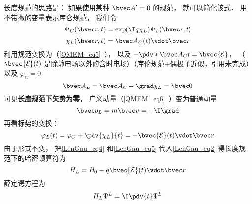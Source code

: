 长度规范的思路是： 如果使用某种 $\bvec A' = 0$ 的规范， 就可以简化该式． 用不带撇的变量表示库仑规范， 我们令
\begin{equation}\label{LenGau_eq1}
\Psi_C(\bvec r, t) = \exp(\I q\chi_L)\Psi_L(\bvec r, t)
\end{equation}
\begin{equation}
\chi_L(\bvec r, t) = \bvec A_C(t) \vdot \bvec r
\end{equation}
利用规范变换为（\autoref{QMEM_eq5}~）， 以及 $-\pdv*{\bvec A_C}{t} = \bvec {\mathcal E}$， （$\bvec {\mathcal E}(t)$ 是除静电场以外的含时电场）（库伦规范+偶极子近似，引用未完成）以及 $\varphi_C = 0$
\begin{equation}\label{LenGau_eq4}
\bvec A_L = \bvec A_C - \grad \chi_L = \bvec 0
\end{equation}
可见\textbf{长度规范下矢势为零}， 广义动量（\autoref{QMEM_eq6}~）变为普通动量
\begin{equation}\label{LenGau_eq6}
\bvec p_L = m \bvec v = -\I \grad
\end{equation}
再看标势的变换：
\begin{equation}\label{LenGau_eq5}
\varphi_L(t) = \varphi_C + \pdv{\chi_L}{t} = -\bvec {\mathcal E}(t) \vdot \bvec r
\end{equation}
由于形式不变， 把\autoref{LenGau_eq4} 和\autoref{LenGau_eq5} 代入\autoref{LenGau_eq2} 得长度规范下的哈密顿算符为
\begin{equation}
H_L = H_0 - q\bvec{\mathcal{E}}(t) \vdot \bvec r
\end{equation}
薛定谔方程为
\begin{equation}\label{LenGau_eq3}
H_L \Psi^L = \I \pdv{t} \Psi^L
\end{equation}
